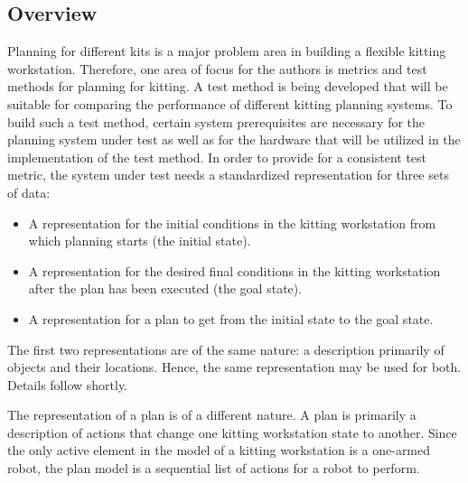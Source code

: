 \subsection{Overview}
Planning for different kits is a major problem area in building a
flexible kitting workstation. Therefore, one area of focus for the
authors is metrics and test methods for planning for
kitting.  A test method is being developed that will be suitable for
comparing the performance of different kitting planning systems.  To build
such a test method, certain system prerequisites are necessary for the planning
system under test as well as for the hardware that will be utilized in
the implementation of the test method.
In order to provide for a consistent test metric, the system under
test needs a standardized representation for three sets of data:
\begin{itemize}
\item A representation for the initial conditions in the kitting workstation
 from which planning starts (the initial state).

\item A representation for the desired final conditions in the kitting
workstation after the plan has been executed (the goal state).

\item A representation for a plan to get from the initial state to the goal
state.
\end{itemize}

The first two representations are of the same nature: a description
primarily of objects and their locations. Hence, the same representation
may be used for both. Details follow shortly.

The representation of a plan is of a different nature. A plan is primarily
a description of actions that change one kitting workstation state to
another. Since the only active element in the model of a kitting
workstation is a one-armed robot, the plan model is a sequential
list of actions for a robot to perform.

